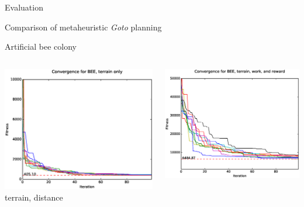 \documentclass[9pt]{beamer}
\begin{document}
\begin{frame}{Evaluation}
    \begin{block}{Comparison of metaheuristic \textit{Goto} planning}
    \end{block}
    \begin{block}{Artificial bee colony}
        \begin{columns}
            \begin{column}{0.5\textwidth}
                \begin{center}
                    \includegraphics[width=\textwidth,trim={.75cm .75cm 0cm 1cm},clip]{img/conv_BEE_a.eps}
                    \linebreak
                    terrain, distance
                \end{center}
            \end{column}
            \begin{column}{0.5\textwidth}
                \begin{center}
                    \includegraphics[width=\textwidth,trim={.75cm .75cm 0cm 1cm},clip]{img/conv_BEE_b.eps}

\end{center}
\end{column}
\end{columns}
\end{block}
\end{frame}
\end{document}
